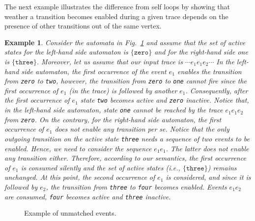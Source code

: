 \documentclass[10pt, preprint]{sigplanconf} %
\newtheorem{example}{Example}
\begin{document}
The next example illustrates the difference from self loops by showing
that weather a transition becomes enabled during a given trace depends
on the presence of other transitions out of the same vertex. 
\begin{example}
Consider the automata in Fig.~\ref{fig:unmatched-example} and assume that the set of active states for the left-hand side automaton is $\{ \texttt{zero} \}$ and for the right-hand side one is $\{ \texttt{three}\}$.
Moreover, let us assume that our input trace is $\cdots e_1 e_1 e_2 \cdots$ In the left-hand side automaton, the first occurrence of the event $e_1$ enables the transition  from {\tt zero} to {\tt two}, however, the transition from {\tt zero} to {\tt one} cannot fire since the first occurrence of $e_1$ (in the trace) is followed by another $e_1$.
Consequently, after the first occurrence of $e_1$ state {\tt two} becomes active and {\tt zero} inactive.
Notice that, in the left-hand side automaton, state {\tt one} cannot be reached by the trace $e_1 e_1 e_2 $ from {\tt zero}.
On the contrary, for the right-hand side automaton, the first occurrence of $e_1$ does not enable any transition per se.
Notice that the only outgoing transition on the active state {\tt three} needs a sequence of two events to be enabled.
Hence, we need to consider the sequence $e_1e_1$.
The latter does not enable any transition either.
Therefore, according to our semantics,  the first occurrence of $e_1$ is consumed silently and the set of active states (i.e., $\{ \texttt{three} \}$) remains unchanged.
At this point, the second occurrence of $e_1$ is considered, and since it is followed by $e_2$, the transition from {\tt three} to {\tt four} becomes enabled.
Events $e_1e_2$ are consumed, {\tt four} becomes active and {\tt three} inactive.
\end{example}

\begin{figure}[t]
\caption{Example of unmatched events.}
\label{fig:unmatched-example}
\end{figure}
\end{document}
